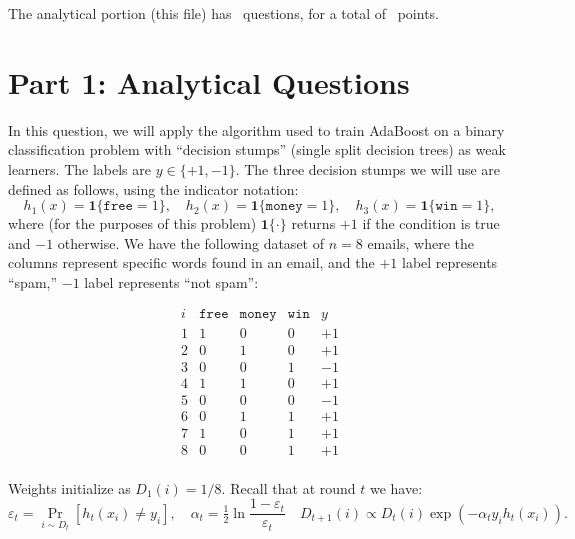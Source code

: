 \documentclass[11pt,addpoints,answers]{exam}
\begin{document}
\begin{center}
The analytical portion (this file) has \numquestions\ questions, for a total of \numpoints\
points.
\end{center}

\newpage

\section*{Part 1: Analytical Questions}

\begin{questions}
\question%
In this question, we will apply the algorithm used to train AdaBoost on a binary classification problem with ``decision stumps'' (single split decision trees) as weak learners. The labels are $y \in \{+1,-1\}$.
The three decision stumps we will use are defined as follows, using the indicator notation:
\[
h_1(x) = \mathbf{1}\{\texttt{free}=1\}, \quad
h_2(x) = \mathbf{1}\{\texttt{money}=1\}, \quad
h_3(x) = \mathbf{1}\{\texttt{win}=1\},
\]
where (for the purposes of this problem) $\mathbf{1}\{\cdot\}$ returns $+1$ if the condition is true and $-1$ otherwise.  
We have the following dataset of $n=8$ emails, where the columns represent specific words found in an email, and the $+1$ label represents ``spam,'' $-1$ label represents ``not spam'':

\[
\begin{array}{c|c|c|c|c}
i & \texttt{free} & \texttt{money} & \texttt{win} & y \\
\hline
1 & 1 & 0 & 0 & +1 \\
2 & 0 & 1 & 0 & +1 \\
3 & 0 & 0 & 1 & -1 \\
4 & 1 & 1 & 0 & +1 \\
5 & 0 & 0 & 0 & -1 \\
6 & 0 & 1 & 1 & +1 \\
7 & 1 & 0 & 1 & +1 \\
8 & 0 & 0 & 1 & +1 \\
\end{array}
\]

Weights initialize as $D_1(i)=1/8$.  
Recall that at round $t$ we have:
\[
\varepsilon_t = \Pr_{i \sim D_t}[h_t(x_i)\neq y_i], \quad
\alpha_t = \tfrac12 \ln \frac{1-\varepsilon_t}{\varepsilon_t} \quad
D_{t+1}(i) \propto D_t(i) \exp(-\alpha_t y_i h_t(x_i)).
\]

\begin{parts}

\end{parts}
\end{questions}
\end{document}
